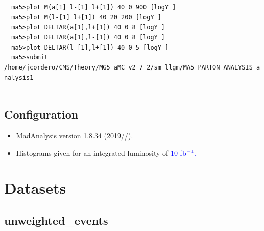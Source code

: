 \documentclass[a4paper, 10pt]{article}
\begin{document}
\texttt{ }\texttt{ }\texttt{ma5>plot M(a[1] l-[1] l+[1]) 40 0 900 [logY ]\\
}
\texttt{ }\texttt{ }\texttt{ma5>plot M(l-[1] l+[1]) 40 20 200 [logY ]\\
}
\texttt{ }\texttt{ }\texttt{ma5>plot DELTAR(a[1],l+[1]) 40 0 8 [logY ]\\
}
\texttt{ }\texttt{ }\texttt{ma5>plot DELTAR(a[1],l-[1]) 40 0 8 [logY ]\\
}
\texttt{ }\texttt{ }\texttt{ma5>plot DELTAR(l-[1],l+[1]) 40 0 5 [logY ]\\
}
\texttt{ }\texttt{ }\texttt{ma5>submit /\-home/\-jcordero/\-CMS/\-Theory/\-MG5\_aMC\_v2\_7\_2/\-sm\_llgm/\-MA5\_PARTON\_ANALYSIS\_analysis1\\
}
\texttt{ }\texttt{ }\subsection{ Configuration}

\begin{itemize}
  \item MadAnalysis version 1.8.34 (2019//).
   \item Histograms given for an integrated luminosity of \textcolor{blue}{10}\textcolor{blue}{ fb}$^{\textcolor{blue}{-1}}$\textcolor{blue}{.}
\textcolor{blue}{}
\end{itemize}
\newpage
\section{ Datasets}

\subsection{ unweighted\_events}
\end{document}
